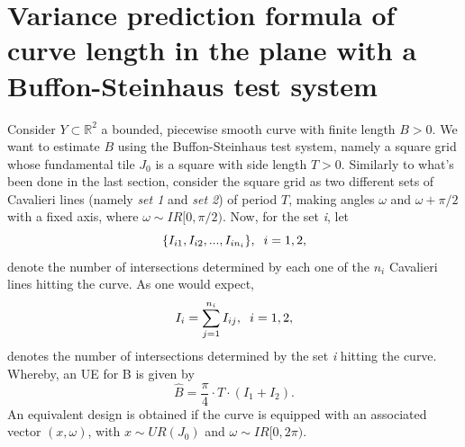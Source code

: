 \section{Variance prediction formula of curve length in the plane with a Buffon-Steinhaus test system}

Consider $Y \subset \mathbb{R}^2$ a bounded, piecewise smooth curve with finite length $B>0$. We want to estimate $B$ using the Buffon-Steinhaus test system, namely a square grid whose fundamental tile $J_0$ is a square with side length $T>0$. Similarly to what's been done in the last section, consider the square grid as two different sets of Cavalieri lines (namely \textit{set 1} and \textit{set 2}) of period $T$, making angles $\omega$ and $\omega + \pi/2$ with a fixed axis, where $\omega \sim IR[0,\pi/2)$. Now, for the set \textit{i}, let 
\begin{equation*}
    \{ I_{i1}, I_{i2}, ..., I_{in_i} \}, \hspace{2mm} i=1,2,
\end{equation*}
denote the number of intersections determined by each one of the $n_i$ Cavalieri lines hitting the curve. As one would expect,
\begin{equation*}
    I_i = \sum_{j=1}^{n_i} I_{ij}, \hspace{2mm} i=1,2,
\end{equation*}
denotes the number of intersections determined by the set \textit{i} hitting the curve. Whereby, an UE for B is given by
\begin{equation*}
    \widehat{B} = \frac{\pi}{4} \cdot T \cdot (I_1+I_2).
\end{equation*}
An equivalent design is obtained if the curve is equipped with an associated vector $(x,\omega)$, with $x\sim UR(J_0)$ and $\omega \sim IR[0,2\pi)$.\\

